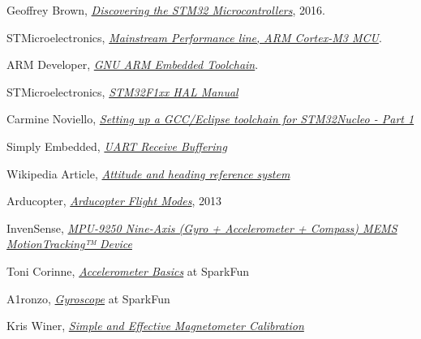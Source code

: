 \documentclass[a4paper,12pt,oneside]{book}
\begin{document}
{\begin{enumerate}
\end{enumerate}



\begin{thebibliography}{20}

Geoffrey Brown,
\href{https://www.cs.indiana.edu/~geobrown/book.pdf}{\textit{Discovering the STM32 Microcontrollers}}, 2016.

STMicroelectronics, \href{http://www.st.com/content/st_com/en/products/microcontrollers/stm32-32-bit-arm-cortex-mcus/stm32f1-series/stm32f103/stm32f103rb.html}{\textit{Mainstream Performance line, ARM Cortex-M3 MCU}}.

ARM Developer, \href{https://developer.arm.com/open-source/gnu-toolchain/gnu-rm}{\textit{GNU ARM Embedded Toolchain}}.

STMicroelectronics, \href{./datasheets/STM32F1 HAL Manual.pdf}{\textit{STM32F1xx HAL Manual}}

Carmine Noviello, \href{http://www.carminenoviello.com/2014/12/28/setting-gcceclipse-toolchain-stm32nucleo-part-1/}{\textit{Setting up a GCC/Eclipse toolchain for STM32Nucleo - Part 1}}

Simply Embedded, \href{http://www.simplyembedded.org/tutorials/interrupt-free-ring-buffer/}{\textit{UART Receive Buffering}}

Wikipedia Article, \href{https://en.wikipedia.org/wiki/Attitude_and_heading_reference_system}{\textit{Attitude and heading reference system}}

Arducopter, \href{http://www.arducopter.co.uk/all-arducopter-guides/arducopter-flight-modes}{\textit{
Arducopter Flight Modes}}, 2013

InvenSense, \href{https://www.invensense.com/products/motion-tracking/9-axis/mpu-9250/}{\textit{MPU-9250 Nine-Axis (Gyro + Accelerometer + Compass) MEMS MotionTracking™ Device}}

Toni Corinne, \href{https://www.sparkfun.com/users/194976}{\textit{Accelerometer Basics}} at SparkFun

A1ronzo, \href{https://learn.sparkfun.com/tutorials/gyroscope/how-a-gyro-works}{\textit{Gyroscope}} at SparkFun

Kris Winer, \href{https://github.com/kriswiner/MPU6050/wiki/Simple-and-Effective-Magnetometer-Calibration}{\textit{Simple and Effective Magnetometer Calibration}}


\end{thebibliography}}
\end{document}
